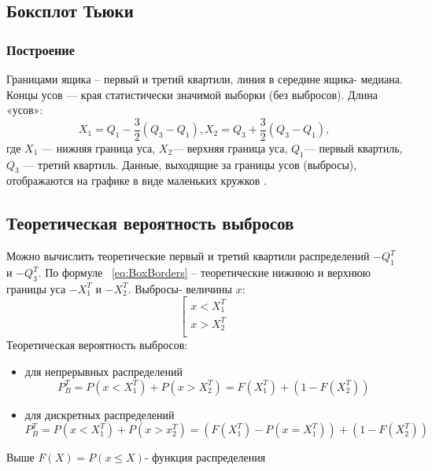 \subsection{Боксплот Тьюки}
	\subsubsection{Построение}
	\noindent Границами ящика – первый и третий квартили, линия в середине ящика- медиана. Концы усов — края статистически значимой выборки (без выбросов). Длина «усов»:
	\begin{equation}
		\label{eq:BoxBorders}
	    {X_1 = Q_1} - \frac{3}{2}{(Q_3 - Q_1)}, {X_2 = Q_3} + \frac{3}{2}{(Q_3 - Q_1)},
	\end{equation}
    где $X_1$ — нижняя граница уса, $X_2$— верхняя граница уса, $Q_1$— первый
    квартиль, $Q_3$ — третий квартиль.
    Данные, выходящие за границы усов (выбросы), отображаются на графике в виде маленьких кружков \cite{litlink3}.

	\subsection{Теоретическая вероятность выбросов}
	\noindent Можно вычислить теоретические первый и третий квартили распределений $-Q_1^T$ и $-Q_3^T$.  По формуле ~\eqref{eq:BoxBorders} – теоретические нижнюю и верхнюю границы уса $-X_1^T$ и $-X_2^T$. Выбросы- величины $x$:
	    \begin{equation}
		    \left[
		    \begin{gathered}
		    x < X_1^T \\
		    x > X_2^T \\
		    \end{gathered}
		    \right.
	    \end{equation}
	Теоретическая вероятность выбросов:
	\begin{itemize}
	    \item для непрерывных распределений
	    \begin{equation}
		    P_B^T = P(x<X_1^T) + P(x>X_2^T)=F(X_1^T) + (1-F(X_2^T))
			\label{eq:ProbabilityOutliersContinuousDistributions}
	    \end{equation}
	    \item для дискретных распределений
	    \begin{equation}
		    P_B^T = P(x<X_1^T)+P(x>x_2^T)=(F(X_1^T)-P(x=X_1^T))+(1-F(X_2^T))
			\label{eq:ProbabilityOutliersDiscreteDistributions}
	    \end{equation}
	\end{itemize}
	Выше $F(X) = P(x\leq{X})$- функция распределения
